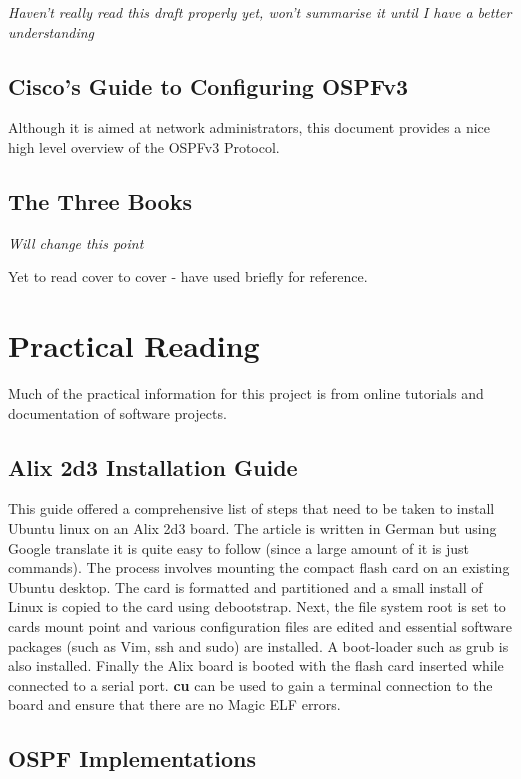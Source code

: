 \documentclass[12pt]{report}
\begin{document}
	\em Haven't really read this draft properly yet, won't summarise it
	until I have a better understanding \em


	\subsection{Cisco's Guide to Configuring OSPFv3}
	
	Although it is aimed at network administrators, this document provides a
	nice high level overview of the OSPFv3 Protocol.

	\subsection{The Three Books}

	\em Will change this point \em 
	
	Yet to read cover to cover - have used briefly for reference. 

\section{Practical Reading}		
Much of the practical information for this project is from online tutorials and
documentation of software projects.  

	\subsection{Alix 2d3 Installation Guide}
	This guide offered a comprehensive list of steps that need to be taken
	to install Ubuntu linux on an Alix 2d3 board.  The article is written in
	German but using Google translate it is quite easy to follow (since a
	large amount of it is just commands).  The process involves mounting the
	compact flash card on an existing Ubuntu desktop.  The card is formatted
	and partitioned and a small install of Linux is copied to the card using
	debootstrap.  Next, the file system root is set to cards mount point and
	various configuration files are edited and essential software packages
	(such as Vim, ssh and sudo) are installed. A boot-loader such as grub is
	also installed.  Finally the Alix board is booted with the flash card
	inserted while connected to a serial port.  {\bf cu} can be used to gain
	a terminal connection to the board and ensure that there are no Magic
	ELF errors. 


	\subsection{OSPF Implementations}
\end{document}
